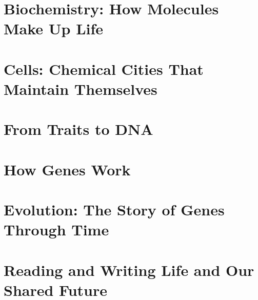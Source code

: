 \documentclass[12pt,openany,fontset=none,UTF8,scheme=chinese]{ctexbook}
\begin{document}
\part{Biochemistry: How Molecules Make Up Life}












\part{Cells: Chemical Cities That Maintain Themselves}










\part{From Traits to DNA}





\part{How Genes Work}










\part{Evolution: The Story of Genes Through Time}






\part{Reading and Writing Life and Our Shared Future}








\appendix







\backmatter
\end{document}
